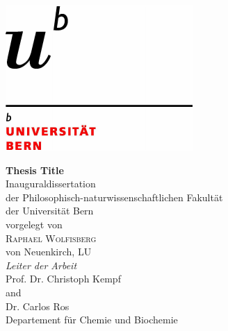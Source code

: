 \documentclass[11pt, titlepage, a4paper, oneside, onecolumn]{scrbook} %
\begin{document}
\fancyhead{} %
\rhead{\thepage} %
\lhead{} %

\pagestyle{fancy} %


\frontmatter %


\setlength{\footskip}{35mm}





\begin{titlepage}
\begin{flushright}
\includegraphics[scale=0.8, trim= 1mm 1mm 15mm 20mm]{logo} \\[2.9 cm]
\end{flushright}
\begin{center}
{\Huge \bfseries Thesis Title} \\[2 cm]
{\Large Inauguraldissertation \\
der Philosophisch-naturwissenschaftlichen Fakultät \\
der Universität Bern \\[2.2 cm]
{\large vorgelegt von}\\[0.3 cm]
{\LARGE \textsc{Raphael Wolfisberg}} \\[0.3 cm] 
{\large von Neuenkirch, LU} \\ [1.2 cm]
{\Large \emph{Leiter der Arbeit}\\ [0.3 cm]
{\textsc Prof. Dr. Christoph Kempf} \\
and \\
{\textsc Dr. Carlos Ros} \\ [0.9 cm]
Departement für Chemie und Biochemie}}
\end{center}
\end{titlepage}
\end{document}

